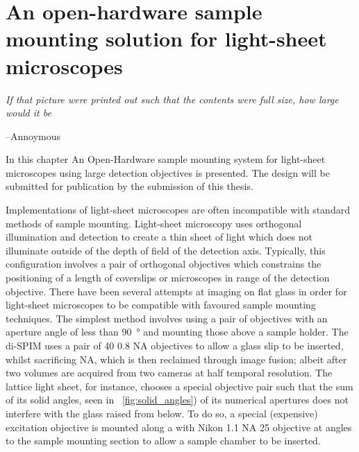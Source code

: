 \ifpdf
    \graphicspath{{Chapters/chamber/Figs/Raster/}{Chapters/chamber/Figs/PDF/}{Chapters/chamber/Figs/}}
\else
    \graphicspath{{Chapters/chamber/Figs/Vector/}{Chapters/chamber/Figs/}}
\fi


\chapter{An open-hardware sample mounting solution for light-sheet microscopes}\label{chapter:chamber}
\epigraph{\emph{If that picture were printed out such that the contents were full size, how large would it be}}{--Annoymous}
 In this chapter An Open-Hardware sample mounting system for light-sheet microscopes using large detection objectives is presented.
 The design will be submitted for publication by the submission of this thesis.

 \pagebreak


 Implementations of light-sheet microscopes are often incompatible with standard methods of sample mounting.
 Light-sheet microscopy uses orthogonal illumination and detection to create a thin sheet of light which does not illuminate outside of the depth of field of the detection axis.
 Typically, this configuration involves a pair of orthogonal objectives which constrains the positioning of a length of coverslips or microscopes in range of the detection objective.
 There have been several attempts at imaging on flat glass in order for light-sheet microscopes to be compatible with favoured sample mounting techniques.
 The simplest method involves using a pair of objectives with an aperture angle of less than \SI{90}{\degree} and mounting those above a sample holder.
 The di-SPIM\cite{1} uses a pair of \SI{40}{\times} 0.8 \gls{NA} objectives to allow a glass slip to be inserted, whilst sacrificing \gls{NA}, which is then reclaimed through image fusion; albeit after two volumes are acquired from two cameras at half temporal resolution.
 The lattice light sheet\cite{2}, for instance, chooses a special objective pair such that the sum of its solid angles, seen in \figurename~\ref{fig:solid_angles}) of its numerical apertures does not interfere with the glass raised from below.
 To do so, a special (expensive) excitation objective is mounted along a with Nikon 1.1 NA \SI{25}{\times} objective at angles to the sample mounting section to allow a sample chamber to be inserted.

